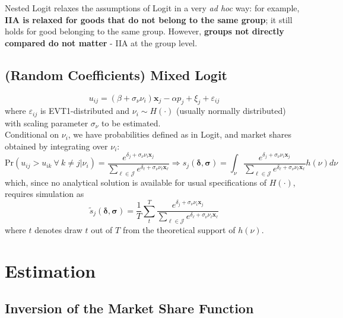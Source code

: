 \documentclass[11pt]{article}
\begin{document}
Nested Logit relaxes the assumptions of Logit in a very \textit{ad hoc} way: for example, \textbf{IIA is relaxed for goods that do not belong to the same group}; it still holds for good belonging to the same group.
However, \textbf{groups not directly compared do not matter} - IIA at the group level.

\subsection{(Random Coefficients) Mixed Logit}
\begin{equation}
	u_{ij} = (\beta + \sigma_{\nu}\nu_i) \mathbf{x}_j  - \alpha p_j + \xi_j + \varepsilon_{ij}
\end{equation}
where $\varepsilon_{ij}$ is EVT1-distributed and $\nu_i \sim H(\cdot)$ (usually normally distributed) with scaling parameter $\sigma_\nu$ to be estimated. \\

Conditional on $\nu_i$, we have probabilities defined as in Logit, and market shares obtained by integrating over $\nu_i$:
\begin{equation}
	 \text{Pr}(u_{ij} > u_{ik} ~\forall~ k \neq j | \nu_i) = \frac{e^{\delta_j + \sigma_{\nu}\nu_i\mathbf{x}_j}}{\sum_{\ell \in \mathscr{J}} e^{\delta_\ell + \sigma_{\nu}\nu_\ell \mathbf{x}_\ell} }
	 \Rightarrow s_j (\bm{\delta, \sigma}) = \int_{\nu} \frac{e^{\delta_j + \sigma_{\nu}\nu_i\mathbf{x}_j}}{\sum_{\ell \in \mathscr{J}} e^{\delta_\ell + \sigma_{\nu}\nu_\ell \mathbf{x}_\ell}} h(\nu) d\nu
\end{equation}
which, since no analytical solution is available for usual specifications of $H(\cdot)$, requires simulation as
\begin{equation}
	\tilde{s}_j (\bm{\delta, \sigma}) = \frac{1}{T} \sum_t^T \frac{e^{\delta_j + \sigma_{\nu}\nu_i\mathbf{x}_j}}{\sum_{\ell \in \mathscr{J}} e^{\delta_\ell + \sigma_{\nu}\nu_\ell \mathbf{x}_\ell}}
\end{equation}
where $t$ denotes draw $t$ out of $T$ from the theoretical support of $h(\nu)$.

\section{Estimation}

\subsection{Inversion of the Market Share Function}
\end{document}

